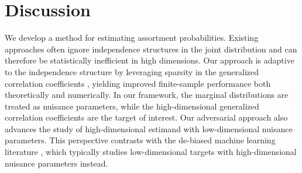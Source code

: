 \documentclass[11pt]{article}
\begin{document}
\section{Discussion}\label{sec:discussion}
We develop a method for estimating assortment probabilities. Existing approaches often ignore independence structures in the joint distribution and can therefore be statistically inefficient in high dimensions. Our approach is adaptive to the independence structure by leveraging sparsity in the generalized correlation coefficients \citep{bahadur1959representation}, yielding improved finite-sample performance both theoretically and numerically. In our framework, the marginal distributions are treated as nuisance parameters, while the high-dimensional generalized correlation coefficients are the target of interest. 
Our adversarial approach also advances the study of high-dimensional estimand with low-dimensional nuisance parameters. This perspective contrasts with the de-biased machine learning literature \citep[e.g.,][]{chernozhukov2017double}, which typically studies low-dimensional targets with high-dimensional nuisance parameters instead.
\end{document}
